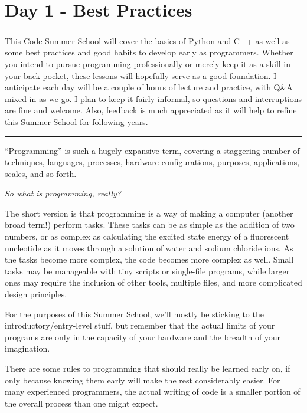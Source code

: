 \chapter{Day 1 - Best Practices}
\paragraph{}This Code Summer School will cover the basics of Python and C++ as well as some best practices and good habits to develop early as programmers.  Whether you intend to pursue programming professionally or merely keep it as a skill in your back pocket, these lessons will hopefully serve as a good foundation.  I anticipate each day will be a couple of hours of lecture and practice, with Q\&A mixed in as we go.  I plan to keep it fairly informal, so questions and interruptions are fine and welcome.  Also, feedback is much appreciated as it will help to refine this Summer School for following years.

\begin{center}\rule{0.5\linewidth}{0.5pt}\end{center}

``Programming'' is such a hugely expansive term,
covering a staggering number of techniques, languages, processes,
hardware configurations, purposes, applications, scales, and so forth.

\emph{So what is programming, really?}

The short version is that programming is a way of making a computer
(another broad term!) perform tasks. These tasks can be as simple as the
addition of two numbers, or as complex as calculating the excited state
energy of a fluorescent nucleotide as it moves through a solution of
water and sodium chloride ions. As the tasks become more complex, the
code becomes more complex as well. Small tasks may be manageable with
tiny scripts or single-file programs, while larger ones may require the
inclusion of other tools, multiple files, and more complicated design
principles.

For the purposes of this Summer School, we'll mostly be sticking to the
introductory/entry-level stuff, but remember that the actual limits of
your programs are only in the capacity of your hardware and the breadth
of your imagination.

There are some rules to programming that should really be learned early
on, if only because knowing them early will make the rest considerably
easier. For many experienced programmers, the actual writing of code is
a smaller portion of the overall process than one might expect.

